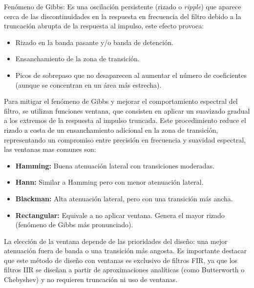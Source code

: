 \documentclass[12pt]{article}
\begin{document}
	Fenómeno de Gibbs: Es una oscilación persistente (rizado o \textit{ripple}) que aparece cerca de las discontinuidades en la respuesta en frecuencia del filtro debido a la truncación abrupta de la respuesta al impulso, este efecto provoca:
	
	\begin{itemize}
		\item Rizado en la banda pasante y/o banda de detención.
		\item Ensanchamiento de la zona de transición.
		\item Picos de sobrepaso que no desaparecen al aumentar el número de coeficientes (aunque se concentran en un área más estrecha).
	\end{itemize}
	
	Para mitigar el fenómeno de Gibbs y mejorar el comportamiento espectral del filtro, se utilizan funciones ventana, que consisten en aplicar un suavizado gradual a los extremos de la respuesta al impulso truncada. Este procedimiento reduce el rizado a costa de un ensanchamiento adicional en la zona de transición, representando un compromiso entre precisión en frecuencia y suavidad espectral, las ventanas mas comunes son:
	
	\begin{itemize}
		\item \textbf{Hamming:} Buena atenuación lateral con transiciones moderadas.
		\item \textbf{Hann:} Similar a Hamming pero con menor atenuación lateral.
		\item \textbf{Blackman:} Alta atenuación lateral, pero con una transición más ancha.
		\item \textbf{Rectangular:} Equivale a no aplicar ventana. Genera el mayor rizado (fenómeno de Gibbs más pronunciado).
	\end{itemize}
	
	La elección de la ventana depende de las prioridades del diseño: una mejor atenuación fuera de banda o una transición más angosta. Es importante destacar que este método de diseño con ventanas es exclusivo de filtros FIR, ya que los filtros IIR se diseñan a partir de aproximaciones analíticas (como Butterworth o Chebyshev) y no requieren truncación ni uso de ventanas.
	
\end{document}
